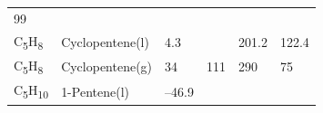 \documentclass[
]{book}
\theoremstyle{definition}
\theoremstyle{definition}
\theoremstyle{definition}
\theoremstyle{remark}
\begin{document}
\begin{longtable}[]{@{}llllll@{}}
\begin{minipage}[t]{0.14\columnwidth}
99\strut
\end{minipage}\tabularnewline
\begin{minipage}[t]{0.07\columnwidth}\raggedright
C\textsubscript{5}H\textsubscript{8}\strut
\end{minipage} & \begin{minipage}[t]{0.17\columnwidth}\raggedright
Cyclopentene(l)\strut
\end{minipage} & \begin{minipage}[t]{0.15\columnwidth}\raggedright
4.3\strut
\end{minipage} & \begin{minipage}[t]{0.15\columnwidth}\raggedright
\strut
\end{minipage} & \begin{minipage}[t]{0.14\columnwidth}\raggedright
201.2\strut
\end{minipage} & \begin{minipage}[t]{0.14\columnwidth}\raggedright
122.4\strut
\end{minipage}\tabularnewline
\begin{minipage}[t]{0.07\columnwidth}\raggedright
C\textsubscript{5}H\textsubscript{8}\strut
\end{minipage} & \begin{minipage}[t]{0.17\columnwidth}\raggedright
Cyclopentene(g)\strut
\end{minipage} & \begin{minipage}[t]{0.15\columnwidth}\raggedright
34\strut
\end{minipage} & \begin{minipage}[t]{0.15\columnwidth}\raggedright
111\strut
\end{minipage} & \begin{minipage}[t]{0.14\columnwidth}\raggedright
290\strut
\end{minipage} & \begin{minipage}[t]{0.14\columnwidth}\raggedright
75\strut
\end{minipage}\tabularnewline
\begin{minipage}[t]{0.07\columnwidth}\raggedright
C\textsubscript{5}H\textsubscript{10}\strut
\end{minipage} & \begin{minipage}[t]{0.17\columnwidth}\raggedright
1-Pentene(l)\strut
\end{minipage} & \begin{minipage}[t]{0.15\columnwidth}\raggedright
--46.9\strut
\end{minipage} & \begin{minipage}[t]{0.15\columnwidth}\raggedright

\end{minipage}
\end{longtable}
\end{document}
